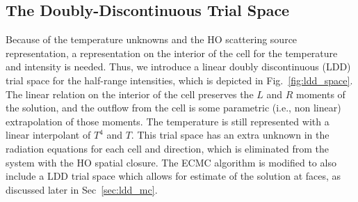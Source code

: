 \subsection{The Doubly-Discontinuous Trial Space}

Because of the temperature unknowns and the HO scattering source representation, a
representation on the interior of the cell for the temperature and intensity is needed.
Thus, we introduce a linear doubly discontinuous (LDD) trial space
for the half-range intensities, which is depicted in Fig.~\ref{fig:ldd_space}.  The linear
relation on the interior of the cell preserves the $L$ and $R$ moments of the solution,
and the outflow from the cell is some parametric (i.e., non linear) extrapolation of
those moments. 
The temperature is still represented with a linear interpolant of $T^4$ and $T$.  This
trial space has an extra unknown in the radiation equations for each cell and direction, which is eliminated
from the system with the HO spatial closure.  The ECMC algorithm is modified to also
include a LDD trial space which allows for estimate of the solution at faces, as discussed
later in Sec~\ref{sec:ldd_mc}. 

